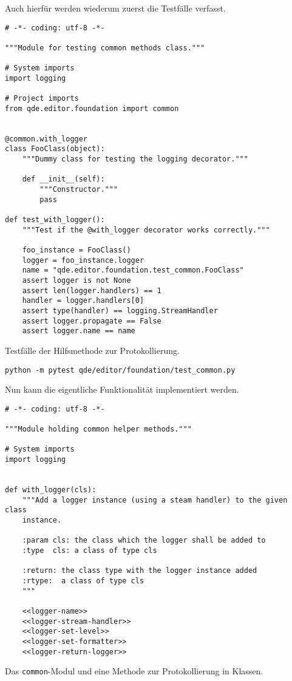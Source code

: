 \documentclass[10pt, openright, notitlepage]{scrreprt}
\begin{document}
Auch hierfür werden wiederum zuerst die Testfälle verfasst.

\begin{listing}[H]
\begin{verbatim}
# -*- coding: utf-8 -*-

"""Module for testing common methods class."""

# System imports
import logging

# Project imports
from qde.editor.foundation import common


@common.with_logger
class FooClass(object):
    """Dummy class for testing the logging decorator."""

    def __init__(self):
        """Constructor."""
        pass

def test_with_logger():
    """Test if the @with_logger decorator works correctly."""

    foo_instance = FooClass()
    logger = foo_instance.logger
    name = "qde.editor.foundation.test_common.FooClass"
    assert logger is not None
    assert len(logger.handlers) == 1
    handler = logger.handlers[0]
    assert type(handler) == logging.StreamHandler
    assert logger.propagate == False
    assert logger.name == name
\end{verbatim}
\caption{\label{org2e5ec0d}
Testfälle der Hilfsmethode zur Protokollierung.}
\end{listing}

\begin{verbatim}
python -m pytest qde/editor/foundation/test_common.py
\end{verbatim}

Nun kann die eigentliche Funktionalität implementiert werden.

\begin{listing}[H]
\begin{verbatim}
# -*- coding: utf-8 -*-

"""Module holding common helper methods."""

# System imports
import logging


def with_logger(cls):
    """Add a logger instance (using a steam handler) to the given class
    instance.

    :param cls: the class which the logger shall be added to
    :type  cls: a class of type cls

    :return: the class type with the logger instance added
    :rtype:  a class of type cls
    """

    <<logger-name>>
    <<logger-stream-handler>>
    <<logger-set-level>>
    <<logger-set-formatter>>
    <<logger-return-logger>>
\end{verbatim}
\caption{\label{org0ebe6ad}
Das \texttt{common}-Modul und eine Methode zur Protokollierung in Klassen.}
\end{listing}
\end{document}
